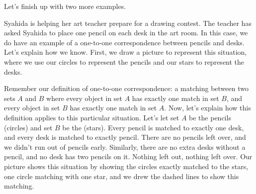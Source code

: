 \documentclass{ximera}
\begin{document}
Let's finish up with two more examples.

\begin{example}
Syahida is helping her art teacher prepare for a drawing contest. The teacher has asked Syahida to place one pencil on each desk in the art room. In this case, we do have an example of a one-to-one correspondence between pencils and desks. Let's explain how we know. First, we draw a picture to represent this situation, where we use our circles to represent the pencils and our stars to represent the desks.
\begin{center}
\end{center}
Remember our definition of one-to-one correspondence: a matching between two sets $A$ and $B$ where every object in set $A$ has exactly one match in set $B$, and every object in set $B$ has exactly one match in set $A$. Now, let's explain how this definition applies to this particular situation. Let's let set $A$ be the pencils (circles) and set $B$ be the  (stars). Every pencil is matched to exactly one desk, and every desk is matched to exactly  pencil. There are no pencils left over, and we didn't run out of pencils early. Similarly, there are no extra desks without a pencil, and no desk has two pencils on it. Nothing left out, nothing left over. Our picture shows this situation by showing the circles exactly matched to the stars, one circle matching with one star, and we drew the dashed lines to show this matching. 

\end{example}
\end{document}
